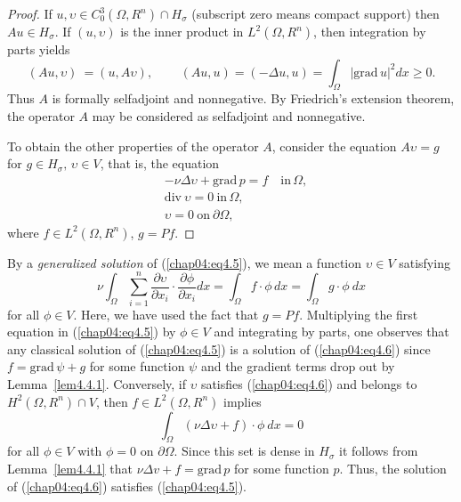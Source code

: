 \documentclass{surv-l}
\theoremstyle{plain}
\theoremstyle{definition}
\numberwithin{equation}{section}
\numberwithin{figure}{chapter}
\begin{document}
\begin{proof} If $u,\upsilon\in C_{0}^{3}(\Omega, R^{n})\cap H_{\sigma}$ (subscript zero means compact support) then $Au\in H_{\sigma}$. If $(u,\upsilon)$ is the inner product in $L^{2}(\Omega, R^{n})$, then integration by parts yields
\begin{equation*}
(Au,\upsilon)\ =(u,A\upsilon),\qquad\,(Au,u)=(-\Delta u,u)=\int_{\Omega}|\mathrm{grad}\,u|^{2}dx\geq 0.
\end{equation*}
Thus $A$ is formally selfadjoint and nonnegative. By Friedrich's extension theorem, the operator $A$ may be considered as selfadjoint and nonnegative.

To obtain the other properties of the operator $A$, consider the equation $A\upsilon=g$ for $g\in H_{\sigma},\,\upsilon\in V$, that is, the equation
\begin{equation}\label{chap04:eq4.5}
\begin{split}
&-\nu\Delta\upsilon +\mathrm{grad}\,p=f\quad \mathrm{in}\,\Omega,\\
&\mathrm{div}\ \upsilon=0\ \mathrm{in}\,\Omega,\\
&\upsilon=0\ \mathrm{on}\ \partial\Omega,
\end{split}
\end{equation}
where $f\in L^{2}(\Omega, R^{n})$, $g=Pf$.
\end{proof}

By a \emph{generalized solution} of (\ref{chap04:eq4.5}), we mean a function $\upsilon\in V$ satisfying
\begin{equation}\label{chap04:eq4.6}
\nu\int_{\Omega}\sum_{i=1}^{n}\frac{\partial \upsilon}{\partial x_{i}}\cdot \frac{\partial\phi}{\partial x_{i}}dx=\int_{\Omega}f\cdot\phi\, dx=\int_{\Omega}g\cdot\phi\ dx
\end{equation}
for all $\phi \in V$. Here, we have used the fact that $g=Pf$. Multiplying the first equation in (\ref{chap04:eq4.5}) by $\phi \in V$ and integrating by parts, one observes that any classical solution of (\ref{chap04:eq4.5}) is a solution of (\ref{chap04:eq4.6}) since $f=\mathrm{grad}\,\psi+g$ for some function $\psi$ and the gradient terms drop out by Lemma~\ref{lem4.4.1}. Conversely, if $\upsilon$ satisfies (\ref{chap04:eq4.6}) and belongs to $H^{2}(\Omega, R^{n})\cap V$, then $f\in L^{2}(\Omega,R^{n})$ implies
\begin{equation*}
\int_{\Omega}(\nu\Delta \upsilon+f)\cdot \phi\ dx=0
\end{equation*}
for all $\phi\in V$ with $\phi=0$ on $\partial\Omega$. Since this set is dense in $H_{\sigma}$ it follows from Lemma~\ref{lem4.4.1} that $\nu\Delta v+f=\mathrm{grad}\,p$ for some function $p$. Thus, the solution of (\ref{chap04:eq4.6}) satisfies (\ref{chap04:eq4.5}).
\end{document}
